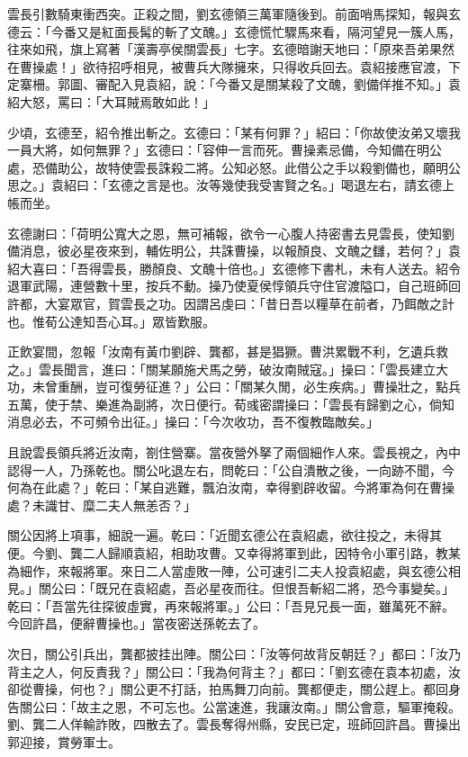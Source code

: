 雲長引數騎東衝西突。正殺之間，劉玄德領三萬軍隨後到。前面哨馬探知，報與玄德云：「今番又是紅面長髯的斬了文醜。」玄德慌忙驟馬來看，隔河望見一簇人馬，往來如飛，旗上寫著「漢壽亭侯關雲長」七字。玄德暗謝天地曰：「原來吾弟果然在曹操處！」欲待招呼相見，被曹兵大隊擁來，只得收兵回去。袁紹接應官渡，下定寨柵。郭圖、審配入見袁紹，說：「今番又是關某殺了文醜，劉備佯推不知。」袁紹大怒，罵曰：「大耳賊焉敢如此！」

少頃，玄德至，紹令推出斬之。玄德曰：「某有何罪？」紹曰：「你故使汝弟又壞我一員大將，如何無罪？」玄德曰：「容伸一言而死。曹操素忌備，今知備在明公處，恐備助公，故特使雲長誅殺二將。公知必怒。此借公之手以殺劉備也，願明公思之。」袁紹曰：「玄德之言是也。汝等幾使我受害賢之名。」喝退左右，請玄德上帳而坐。

玄德謝曰：「荷明公寬大之恩，無可補報，欲令一心腹人持密書去見雲長，使知劉備消息，彼必星夜來到，輔佐明公，共誅曹操，以報顏良、文醜之讎，若何？」袁紹大喜曰：「吾得雲長，勝顏良、文醜十倍也。」玄德修下書札，未有人送去。紹令退軍武陽，連營數十里，按兵不動。操乃使夏侯惇領兵守住官渡隘口，自己班師回許都，大宴眾官，賀雲長之功。因謂呂虔曰：「昔日吾以糧草在前者，乃餌敵之計也。惟荀公達知吾心耳。」眾皆歎服。

正飲宴間，忽報「汝南有黃巾劉辟、龔都，甚是猖獗。曹洪累戰不利，乞遺兵救之。」雲長聞言，進曰：「關某願施犬馬之勞，破汝南賊寇。」操曰：「雲長建立大功，未曾重酬，豈可復勞征進？」公曰：「關某久閒，必生疾病。」曹操壯之，點兵五萬，使于禁、樂進為副將，次日便行。荀彧密謂操曰：「雲長有歸劉之心，倘知消息必去，不可頻令出征。」操曰：「今次收功，吾不復教臨敵矣。」

且說雲長領兵將近汝南，劄住營寨。當夜營外拏了兩個細作人來。雲長視之，內中認得一人，乃孫乾也。關公叱退左右，問乾曰：「公自潰散之後，一向跡不聞，今何為在此處？」乾曰：「某自逃難，飄泊汝南，幸得劉辟收留。今將軍為何在曹操處？未識甘、糜二夫人無恙否？」

關公因將上項事，細說一遍。乾曰：「近聞玄德公在袁紹處，欲往投之，未得其便。今劉、龔二人歸順袁紹，相助攻曹。又幸得將軍到此，因特令小軍引路，教某為細作，來報將軍。來日二人當虛敗一陣，公可速引二夫人投袁紹處，與玄德公相見。」關公曰：「既兄在袁紹處，吾必星夜而往。但恨吾斬紹二將，恐今事變矣。」乾曰：「吾當先往探彼虛實，再來報將軍。」公曰：「吾見兄長一面，雖萬死不辭。今回許昌，便辭曹操也。」當夜密送孫乾去了。

次日，關公引兵出，龔都披挂出陣。關公曰：「汝等何故背反朝廷？」都曰：「汝乃背主之人，何反責我？」關公曰：「我為何背主？」都曰：「劉玄德在袁本初處，汝卻從曹操，何也？」關公更不打話，拍馬舞刀向前。龔都便走，關公趕上。都回身告關公曰：「故主之恩，不可忘也。公當速進，我讓汝南。」關公會意，驅軍掩殺。劉、龔二人佯輸詐敗，四散去了。雲長奪得州縣，安民已定，班師回許昌。曹操出郭迎接，賞勞軍士。

